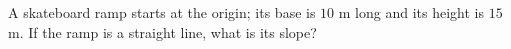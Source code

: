 A skateboard ramp starts at the origin; its base is $10$ m long and its height is $15$ m. If the ramp is a straight line, what is its slope?
